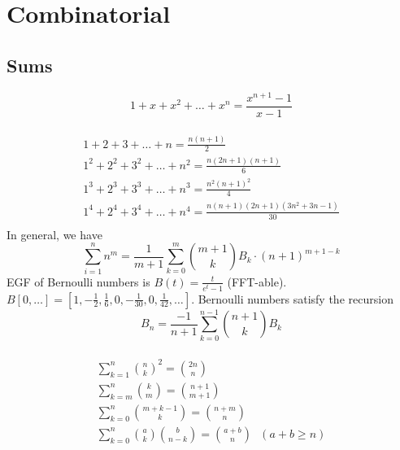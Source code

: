 \section{Combinatorial}

\subsection{Sums}
\[ 1+x+x^2+\ldots + x^n = \frac{x^{n+1}-1}{x-1} \]
\vspace{3pt}\\
\begin{align*}
1 + 2 + 3 + \ldots + n = \frac{n(n+1)}{2}\\
1^2 + 2^2 + 3^2 + \ldots + n^2 = \frac{n(2n+1)(n+1)}{6}\\
1^3 + 2^3 + 3^3 + \ldots + n^3 = \frac{n^2(n+1)^2}{4}\\
1^4 + 2^4 + 3^4 + \ldots + n^4 = \frac{n(n+1)(2n+1)(3n^2+3n-1)}{30}\\
\end{align*}
In general, we have 
\[ \sum_{i=1}^n n^m = \frac{1}{m+1} \sum_{k=0}^m \binom{m+1}{k} B_k \cdot (n+1)^{m+1-k} \]
EGF of Bernoulli numbers is $B(t)=\frac{t}{e^t-1}$ (FFT-able).
$B[0,\ldots] = [1, -\frac{1}{2}, \frac{1}{6}, 0, -\frac{1}{30}, 0, \frac{1}{42}, \ldots]$.
Bernoulli numbers satisfy the recursion
\[ B_n = \frac{-1}{n+1}\sum_{k=0}^{n-1}\binom{n+1}{k}B_k \]
\vspace{3pt}\\
\begin{align*}
\sum_{k=1}^n \binom{n}{k}^2 = \binom{2n}{n}\\
\sum_{k=m}^{n} \binom{k}{m} = \binom{n+1}{m+1}\\
\sum_{k=0}^{n} \binom{m+k-1}{k} = \binom{n+m}{n}\\
\sum_{k=0}^n \binom{a}{k}\binom{b}{n-k} = \binom{a+b}{n} \:\:\: (a+b \geq n)\\
\end{align*}

